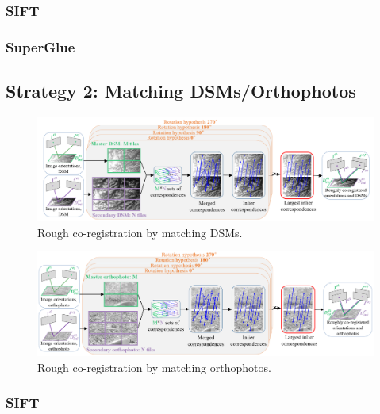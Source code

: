 \subsubsection{SIFT}
\subsubsection{SuperGlue}
\subsection{Strategy 2: Matching DSMs/Orthophotos}
\begin{figure}[htbp]
	\begin{center}
		\includegraphics[width=1\columnwidth]{images/Chapitre3/dsm.png}
		\caption{Rough co-registration by matching DSMs.}
		\label{Flow-process diagram}
	\end{center}
\end{figure}

\begin{figure}[htbp]
	\begin{center}
		\includegraphics[width=1\columnwidth]{images/Chapitre3/ortho.png}
		\caption{Rough co-registration by matching orthophotos.}
		\label{Flow-process diagram}
	\end{center}
\end{figure}

\subsubsection{SIFT}
